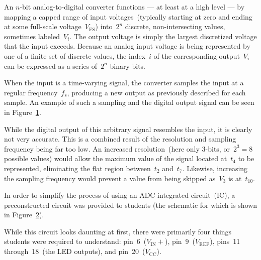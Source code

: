 An $n$-bit analog-to-digital converter functions --- at least at a high level
--- by mapping a capped range of input voltages~(typically starting at zero and ending
at some full-scale voltage~$V_\text{FS}$) into~$2^n$ discrete, non-intersecting
values, sometimes labeled~$V_i$.  The output voltage is simply the largest
discretized voltage that the input exceeds.  Because an analog input voltage is
being represented by one of a finite set of discrete values, the index~$i$ of
the corresponding output~$V_i$ can be expressed as a series of~$2^n$ binary
bits.

When the input is a time-varying signal, the converter samples the input
at a regular frequency~$f_s$, producing a new output as previously described
for each sample.  An example of such a sampling and the digital output signal
can be seen in Figure~\ref{fig:theory}.
%
\begin{figure}[H]
	\centering
	\caption{}
	\label{fig:theory}
\end{figure}
%
While the digital output of this arbitrary signal resembles the input, it is
clearly not very accurate.  This is a combined result of the resolution and
sampling frequency being far too low.  An increased resolution~(here only
3-bits, or~$2^3 = 8$ possible values) would allow the maximum value of the
signal located at~$t_4$ to be represented, eliminating the flat region
between~$t_2$ and~$t_7$.  Likewise, increasing the sampling frequency would
prevent a value from being skipped as~$V_3$ is at~$t_{10}$.

In order to simplify the process of using an ADC integrated circuit~(IC), a
preconstructed circuit was provided to students (the schematic for which is
shown in Figure~\ref{fig:adcSchem}).
%
\begin{figure}[H]
	\centering
	
	\label{fig:adcSchem}
\end{figure}
%
While this circuit looks daunting at first, there were primarily four things
students were required to understand:  pin~6~($V_\text{IN}+$),
pin~9~($V_\text{REF}$), pins~11 through~18~(the LED outputs), and
pin~20~($V_\text{CC}$).

